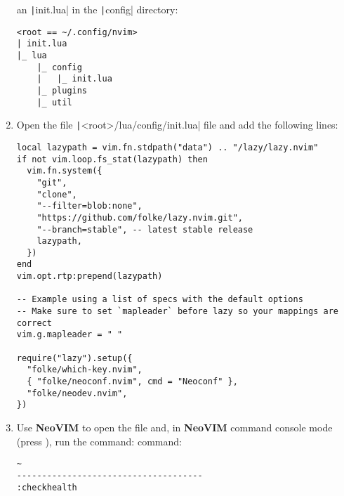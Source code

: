\begin{enumerate}
    an \texttt|init.lua| in the \texttt|config| directory: 
    \begin{verbatim}
<root == ~/.config/nvim>
| init.lua
|_ lua
    |_ config
    |   |_ init.lua    
    |_ plugins
    |_ util
    \end{verbatim}
    \item Open the file \texttt|<root>/lua/config/init.lua| file and
    add the following lines:
    \begin{verbatim}
local lazypath = vim.fn.stdpath("data") .. "/lazy/lazy.nvim"
if not vim.loop.fs_stat(lazypath) then
  vim.fn.system({
    "git",
    "clone",
    "--filter=blob:none",
    "https://github.com/folke/lazy.nvim.git",
    "--branch=stable", -- latest stable release
    lazypath,
  })
end
vim.opt.rtp:prepend(lazypath)

-- Example using a list of specs with the default options
-- Make sure to set `mapleader` before lazy so your mappings are correct
vim.g.mapleader = " " 

require("lazy").setup({
  "folke/which-key.nvim",
  { "folke/neoconf.nvim", cmd = "Neoconf" },
  "folke/neodev.nvim",
})
    \end{verbatim}
    \item Use \textbf{NeoVIM} to open the file and, in \textbf{NeoVIM} command
    console mode (press ), run the command:
    command:
    \begin{verbatim}
~
-------------------------------------
:checkhealth
    \end{verbatim}
\end{enumerate}

